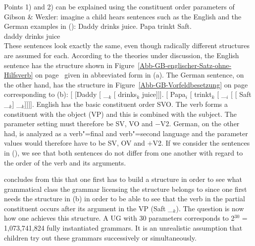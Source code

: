 Points 1) and 2) can be explained using the constituent order parameters of Gibson \& Wexler:
imagine a child hears sentences such as the English and the German examples in ():
\eal
\ex Daddy drinks juice.
\ex 
\gll Papa trinkt Saft.\\
     daddy drinks juice\\
\zl
These sentences look exactly the same, even though radically different structures are assumed for each.
According to the theories under discussion, the English sentence has the structure shown in Figure~\ref{Abb-GB-englischer-Satz-ohne-Hilfsverb} on
page~\pageref{Abb-GB-englischer-Satz-ohne-Hilfsverb} given in abbreviated form in (a).
The German sentence, on the other hand, has the structure in Figure~\ref{Abb-GB-Vorfeldbesetzung} 
on page~\pageref{Abb-GB-Vorfeldbesetzung} corresponding to (b):
\eal
\ex {}[ [Daddy [ \_$_k$ [ drinks$_k$ juice]]].
\ex {}[ Papa$_i$ [ trinkt$_k$ [ \_$_i$ [ [ Saft \_$_k$] \_$_k$]]]].
\zl
English has the basic constituent order SVO. The verb forms a constituent with the object (VP) and this
is combined with the subject. The parameter setting must therefore be SV, VO and $-$V2. German,
on the other had, is analyzed as a verb"=final and verb"=second language and the parameter values
would therefore have to be SV, OV and $+$V2. If we consider the sentences in (), we see that
both sentences do not differ from one another with regard to the order of the verb and its arguments.

\citet{Fodor98a,Fodor98b} concludes from this that one first has to build a structure in order to see
what grammatical class the grammar licensing the structure belongs to since one first needs the structure
in (b) in order to be able to see
that the verb in the partial constituent occurs after its argument in the VP (Saft \_$_k$). The question is now how one achieves
this structure. A UG with 30 parameters corresponds to 2$^{30}$ = 1,073,741,824 fully instantiated grammars.
It is an unrealistic assumption that children try out these grammars successively or simultaneously.

